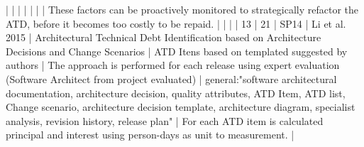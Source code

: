 |    |            |      |                                                                      |                                                                                                                                                                          |                                                                                                                                                                                                                                                            | These factors can be proactively monitored to strategically refactor the ATD, before it becomes too costly to be repaid.                                                                                                                                             |                                                                                                                                                                                                                                                                                                          |                                                                                                                                                                                                                                                                                                                                                                                                                                                                                              |
| 13 |         21 | SP14 | Li et al. 2015                                                       | Architectural Technical Debt Identification based on Architecture Decisions and Change Scenarios                                                                         | ATD Itens based on templated suggested by authors                                                                                                                                                                                                          | The approach is performed for each release using expert evaluation (Software Architect from project evaluated)                                                                                                                                                     | general:"software architectural documentation, architecture decision, quality attributes, ATD Item, ATD list, Change scenario, architecture decision template, architecture diagram, specialist analysis, revision history, release plan"                                                                | For each ATD item is calculated principal and interest using person-days as unit to measurement.                                                                                                                                                                                                                                                                                                                                                                                         |
